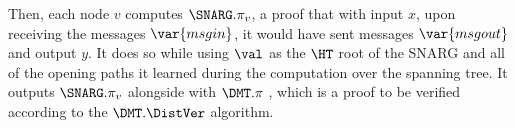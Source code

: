 Then, each node $v$ computes $\SNARG.\pi_v$, a proof that with input $x$, upon receiving the messages $\var{msgin}$, it would have sent messages $\var{msgout}$ and output $y$. It does so while using $\val$ as the $\HT$ root of the SNARG and all of the opening paths it learned during the computation over the spanning tree. It outputs $\SNARG.\pi_v$ alongside with $\DMT.\pi$ , which is a proof to be verified according to the $\DMT.\DistVer$ algorithm. 

